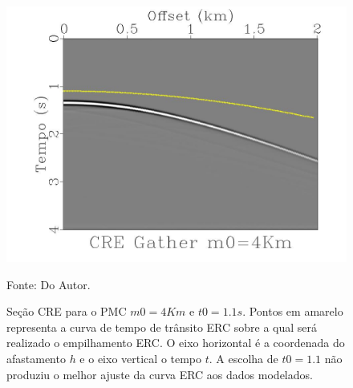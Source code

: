\begin{figure}
\caption{Seção CRE para o PMC $m0=4Km$ e $t0=1.1s$.
Pontos em amarelo representa a curva de tempo de trânsito ERC sobre a qual
será realizado o empilhamento ERC.
O eixo horizontal é a coordenada do afastamento $h$ e o eixo vertical o tempo
$t$. A escolha de $t0=1.1$ não produziu o melhor ajuste da curva ERC aos dados modelados.}
\begin{center}
\includegraphics[scale=0.3]{images/interpolacaoErro.jpeg}
\vspace{-0.3cm}
\end{center}
\begin{center}
 Fonte: Do Autor.
\end{center}
\label{fig:6.3}
\end{figure}

